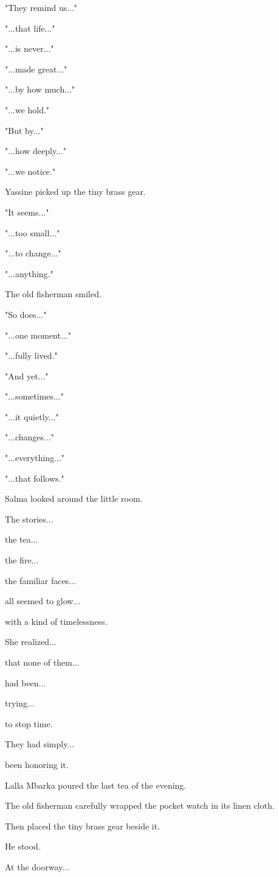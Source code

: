 \documentclass[12pt,openany]{book}
\begin{document}
"They remind us..."

"...that life..."

"...is never..."

"...made great..."

"...by how much..."

"...we hold."

"But by..."

"...how deeply..."

"...we notice."

Yassine picked up the tiny brass gear.

"It seems..."

"...too small..."

"...to change..."

"...anything."

The old fisherman smiled.

"So does..."

"...one moment..."

"...fully lived."

"And yet..."

"...sometimes..."

"...it quietly..."

"...changes..."

"...everything..."

"...that follows."

Salma looked around the little room.

The stories...

the tea...

the fire...

the familiar faces...

all seemed to glow...

with a kind of timelessness.

She realized...

that none of them...

had been...

trying...

to stop time.

They had simply...

been honoring it.

Lalla Mbarka poured the last tea of the evening.

The old fisherman carefully wrapped the pocket watch in its linen cloth.

Then placed the tiny brass gear beside it.

He stood.

At the doorway...
\end{document}

